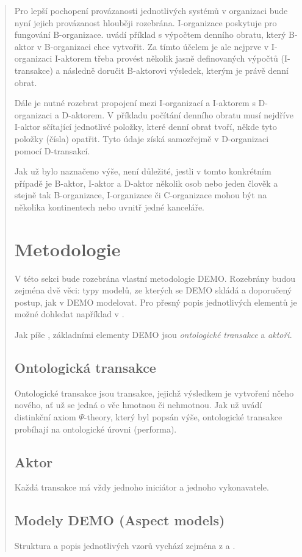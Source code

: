 \documentclass[]{article}
\newcommand{\ptheory}{$\Psi$-theory}
\begin{document}
\begin{quote}
Pro lepší pochopení provázanosti jednotlivých systémů v organizaci bude nyní jejich provázanost hlouběji rozebrána. I-organizace poskytuje  pro fungování B-organizace. \cite{Dietz2006} uvádí příklad s výpočtem denního obratu, který B-aktor v B-organizaci chce vytvořit. Za tímto účelem je ale nejprve v I-organizaci I-aktorem třeba provést několik jasně definovaných výpočtů (I-transakce) a následně doručit B-aktorovi výsledek, kterým je právě denní obrat.

Dále je nutné rozebrat propojení mezi I-organizací a I-aktorem s D-organizaci a D-aktorem. V příkladu počítání denního obratu musí nejdříve I-aktor sčítající jednotlivé položky, které denní obrat tvoří, někde tyto položky (čísla) opatřit. Tyto údaje získá samozřejmě v D-organizaci pomocí D-transakcí.

Jak už bylo naznačeno výše, není důležité, jestli v tomto konkrétním případě je B-aktor, I-aktor a D-aktor několik osob nebo jeden člověk a stejně tak B-organizace, I-organizace či C-organizace mohou být na několika kontinentech nebo uvnitř jedné kanceláře.

\section{Metodologie}
V této sekci bude rozebrána vlastní metodologie DEMO. Rozebrány budou zejména dvě věci: typy modelů, ze kterých se DEMO skládá a doporučený postup, jak v DEMO modelovat. Pro přesný popis jednotlivých elementů je možné dohledat například v \cite{2006}.

Jak píše \cite{Vejrazkova2012}, základními elementy DEMO jsou \textit{ontologické transakce} a \textit{aktoři}.

\subsection{Ontologická transakce}
Ontologické transakce jsou transakce, jejichž výsledkem je vytvoření nčeho nového, ať už se jedná o věc hmotnou či nehmotnou. Jak už uvádí distinkční axiom \ptheory, který byl popsán výše, ontologické transakce probíhají na ontologické úrovni (performa).

\subsection{Aktor}
Každá transakce má vždy jednoho iniciátor a jednoho vykonavatele.

\subsection{Modely DEMO (Aspect models)}
Struktura a popis jednotlivých vzorů vychází zejména z \cite{Vejrazkova2003} a \cite{Dietz2005}.


\end{quote}
\end{document}
